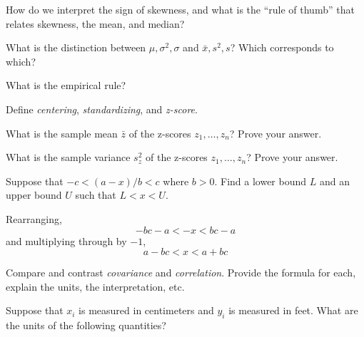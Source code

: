 \documentclass[addpoints,12pt]{exam}
\begin{document}
\begin{questions}
\question How do we interpret the sign of skewness, and what is the ``rule of thumb'' that relates skewness, the mean, and median?

\question What is the distinction between $\mu, \sigma^2, \sigma$ and $\bar{x}, s^2, s$? Which corresponds to which?

\question What is the empirical rule?

\question Define \emph{centering}, \emph{standardizing}, and \emph{z-score}.

\question What is the sample mean $\bar{z}$ of the z-scores $z_1, \dots, z_n$? Prove your answer.

\question What is the sample variance $s_z^2$ of the z-scores $z_1, \dots, z_n$? Prove your answer.

\question Suppose that $-c < (a - x)/b < c$ where $b>0$. Find a lower bound $L$ and an upper bound $U$ such that $L < x < U$.
			\begin{solution}
				Rearranging, 
					$$-bc - a < -x < bc - a$$
				and multiplying through by $-1$,
					$$a - bc < x <a + bc$$
        \end{solution}

\question Compare and contrast \emph{covariance} and \emph{correlation}. Provide the formula for each, explain the units, the interpretation, etc.

\question Suppose that $x_i$ is measured in centimeters and $y_i$ is measured in feet. What are the units of the following quantities? 


\end{questions}
\end{document}
